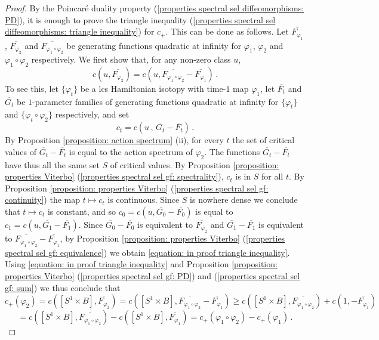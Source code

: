 \documentclass{amsart}
\theoremstyle{remark}
\begin{document}
\begin{proof}
By the Poincar\'e duality property
(\ref{properties spectral sel diffeomorphisms: PD}),
it is enough to prove the triangle inequality
(\ref{properties spectral sel diffeomorphisms: triangle inequality})
for $c_+$.
This can be done as follows.
Let $\overline{F_{\varphi_1}}$,
$\overline{F_{\varphi_2}}$ and $\overline{F_{\varphi_1 \circ \varphi_2}}$
be generating functions quadratic at infinity
for $\varphi_1$, $\varphi_2$ and $\varphi_1 \circ \varphi_2$ respectively.
We first show that,
for any non-zero class $u$,
\begin{equation}\label{equation: in proof triangle inequality}
c (u, \overline{F_{\varphi_2}})
= c (u, \overline{F_{\varphi_1 \circ \varphi_2}} - \overline{F_{\varphi_1}}) \,.
\end{equation}
To see this,
let $\{\varphi_t\}$ be a lcs Hamiltonian isotopy
with time-$1$ map $\varphi_1$,
let $\overline{F_t}$ and $\overline{G_t}$
be $1$-parameter families of generating functions quadratic at infinity
for $\{\varphi_t\}$ and $\{\varphi_t \circ \varphi_2\}$ respectively,
and set
\[
c_t = c (u \,,\, \overline{G_t} - \overline{F_t}) \,.
\]
By Proposition \ref{proposition: action spectrum} (ii),
for every $t$ the set of critical values of $\overline{G_t} - \overline{F_t}$
is equal to the action spectrum of $\varphi_2$.
The functions $\overline{G_t} - \overline{F_t}$
have thus all the same set $S$ of critical values.
By Proposition \ref{proposition: properties Viterbo}
(\ref{properties spectral sel gf: spectrality}),
$c_t$ is in $S$ for all $t$.
By Proposition \ref{proposition: properties Viterbo}
(\ref{properties spectral sel gf: continuity})
the map $t \mapsto c_t$ is continuous. 
Since $S$ is nowhere dense
we conclude that $t \mapsto c_t$ is constant,
and so $c_0 = c (u, \overline{G_0} - \overline{F_0})$
is equal to $c_1 = c (u, \overline{G_1} - \overline{F_1})$.
Since $\overline{G_0} - \overline{F_0}$
is equivalent to $\overline{F_{\varphi_2}}$
and $\overline{G_1} - \overline{F_1}$ is equivalent to 
$\overline{F_{\varphi_1 \circ \varphi_2}} - \overline{F_{\varphi_1}}$,
by Proposition \ref{proposition: properties Viterbo}
(\ref{properties spectral sel gf: equivalence})
we obtain \eqref{equation: in proof triangle inequality}.
Using \eqref{equation: in proof triangle inequality}
and Proposition \ref{proposition: properties Viterbo}
(\ref{properties spectral sel gf: PD})
and (\ref{properties spectral sel gf: sum})
we thus conclude that
\[
c_+(\varphi_2) = c ([S^1 \times B], \overline{F_{\varphi_2}})
= c ([S^1 \times B], \overline{F_{\varphi_1 \circ \varphi_2}} - \overline{F_{\varphi_1}})
\geq c ([S^1 \times B], \overline{F_{\varphi_1 \circ \varphi_2}}) + c (1, - \overline{F_{\varphi_1}})
\]
\[
= c ([S^1 \times B], \overline{F_{\varphi_1 \circ \varphi_2}})
- c ([S^1 \times B], \overline{F_{\varphi_1}})
= c_+ (\varphi_1 \circ \varphi_2) - c_+ (\varphi_1) \,.
\]


\end{proof}
\end{document}
